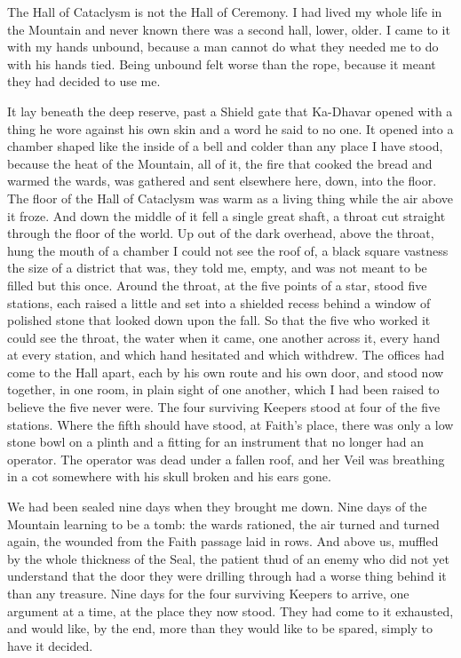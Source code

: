 
The Hall of Cataclysm is not the Hall of Ceremony. I had lived my whole life in the Mountain and never known there was a second hall, lower, older. I came to it with my hands unbound, because a man cannot do what they needed me to do with his hands tied. Being unbound felt worse than the rope, because it meant they had decided to use me.\par

It lay beneath the deep reserve, past a Shield gate that Ka-Dhavar opened with a thing he wore against his own skin and a word he said to no one. It opened into a chamber shaped like the inside of a bell and colder than any place I have stood, because the heat of the Mountain, all of it, the fire that cooked the bread and warmed the wards, was gathered and sent elsewhere here, down, into the floor. The floor of the Hall of Cataclysm was warm as a living thing while the air above it froze. And down the middle of it fell a single great shaft, a throat cut straight through the floor of the world. Up out of the dark overhead, above the throat, hung the mouth of a chamber I could not see the roof of, a black square vastness the size of a district that was, they told me, empty, and was not meant to be filled but this once. Around the throat, at the five points of a star, stood five stations, each raised a little and set into a shielded recess behind a window of polished stone that looked down upon the fall. So that the five who worked it could see the throat, the water when it came, one another across it, every hand at every station, and which hand hesitated and which withdrew. The offices had come to the Hall apart, each by his own route and his own door, and stood now together, in one room, in plain sight of one another, which I had been raised to believe the five never were. The four surviving Keepers stood at four of the five stations. Where the fifth should have stood, at Faith's place, there was only a low stone bowl on a plinth and a fitting for an instrument that no longer had an operator. The operator was dead under a fallen roof, and her Veil was breathing in a cot somewhere with his skull broken and his ears gone.\par

We had been sealed nine days when they brought me down. Nine days of the Mountain learning to be a tomb: the wards rationed, the air turned and turned again, the wounded from the Faith passage laid in rows. And above us, muffled by the whole thickness of the Seal, the patient thud of an enemy who did not yet understand that the door they were drilling through had a worse thing behind it than any treasure. Nine days for the four surviving Keepers to arrive, one argument at a time, at the place they now stood. They had come to it exhausted, and would like, by the end, more than they would like to be spared, simply to have it decided.\par

